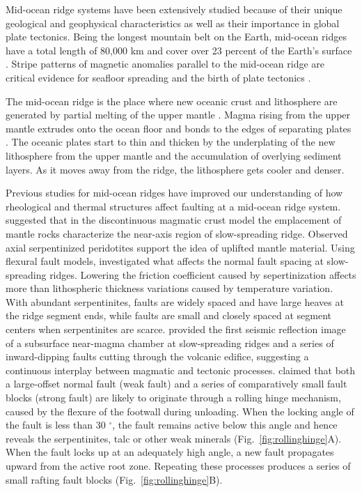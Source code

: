 \documentclass[letterpaper,12pt,notitle]{memphisthesis}                     %
\begin{document}
Mid-ocean ridge systems have been extensively studied because of their unique geological and geophysical characteristics as well as their importance in global plate tectonics. Being the longest mountain belt on the Earth, mid-ocean ridges have a total length of 80,000 km and cover over 23 percent of the Earth’s surface \citep{Peltier1989}. Stripe patterns of magnetic anomalies parallel to the mid-ocean ridge are critical evidence for seafloor spreading and the birth of plate tectonics \citep{Hess1964}.

The mid-ocean ridge is the place where new oceanic crust and lithosphere are generated by partial melting of the upper mantle \citep{Cann1968}. Magma rising from the upper mantle extrudes onto the ocean floor and bonds to the edges of separating plates \citep{Chen1992}. The oceanic plates start to thin and thicken by the underplating of the new lithosphere from the upper mantle and the accumulation of overlying sediment layers. As it moves away from the ridge, the lithosphere gets cooler and denser.

Previous studies for mid-ocean ridges have improved our understanding of how rheological and thermal structures affect faulting at a mid-ocean ridge system.
\citet{Cannat1993} suggested that in the discontinuous magmatic crust model the emplacement of mantle rocks characterize the near-axis region of slow-spreading ridge. Observed axial serpentinized peridotites support the idea of uplifted mantle material. Using flexural fault models, \citet{Escartin1997} investigated what affects the normal fault spacing at slow-spreading ridges. Lowering the friction coefficient caused by sepertinization affects more than lithospheric thickness variations caused by temperature variation. With abundant serpentinites, faults are widely spaced and have large heaves at the ridge segment ends, while faults are small and closely spaced at segment centers when serpentinites are scarce. \citet{Singh2006} provided the first seismic reflection image of a subsurface near-magma chamber at slow-spreading ridges and a series of inward-dipping faults cutting through the volcanic edifice, suggesting a continuous interplay between magmatic and tectonic processes. \citet{Reston2011} claimed that both a large-offset normal fault (weak fault) and a series of comparatively small fault blocks (strong fault) are likely to originate through a rolling hinge mechanism, caused by the flexure of the footwall during unloading. When the locking angle of the fault is less than 30 $^{\circ}$, the fault remains active below this angle and hence reveals the serpentinites, talc or other weak minerals (Fig.~\ref{fig:rollinghinge}A). When the fault locks up at an adequately high angle, a new fault propagates upward from the active root zone. Repeating these processes produces a series of small rafting fault blocks (Fig.~\ref{fig:rollinghinge}B). 
\end{document}

